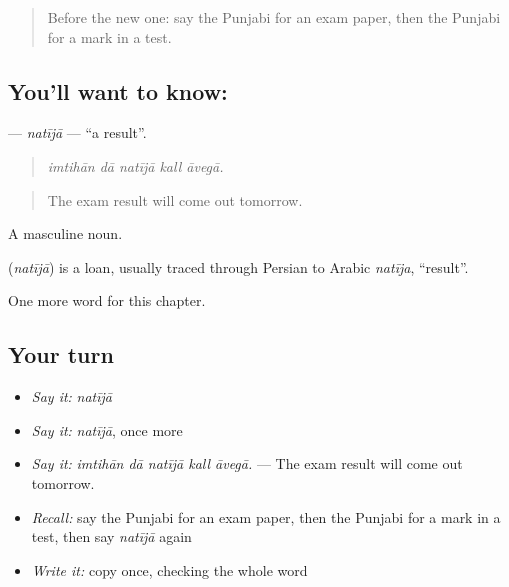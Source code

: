 \label{lesson:PA-C360-natija}



\begin{quote}
Before the new one: say the Punjabi for an exam paper, then the Punjabi for a mark in a test.
\end{quote}

\subsection*{You'll want to know: }
\textbf{} — \emph{natījā} — \textquotedblleft{}a result\textquotedblright{}.

\begin{quote}
    
\end{quote}

\begin{quote}
\emph{imtihān dā natījā kall āvegā.}
\end{quote}

\begin{quote}
The exam result will come out tomorrow.
\end{quote}

A masculine noun.

\begin{cousinweb}
\textbf{} (\emph{natījā}) is a loan, usually traced through Persian to Arabic \emph{natīja}, \textquotedblleft{}result\textquotedblright{}.
\end{cousinweb}

\begin{grammarlens}[title={What you've built}]
One more word for this chapter.
\end{grammarlens}

\subsection*{Your turn}
\begin{itemize}
\raggedright
  \item \emph{Say it:} \emph{natījā}
  \item \emph{Say it:} \emph{natījā}, once more
  \item \emph{Say it:} \emph{imtihān dā natījā kall āvegā.} — The exam result will come out tomorrow.
  \item \emph{Recall:} say the Punjabi for an exam paper, then the Punjabi for a mark in a test, then say \emph{natījā} again
  \item \emph{Write it:} copy \textbf{} once, checking the whole word
\end{itemize}

